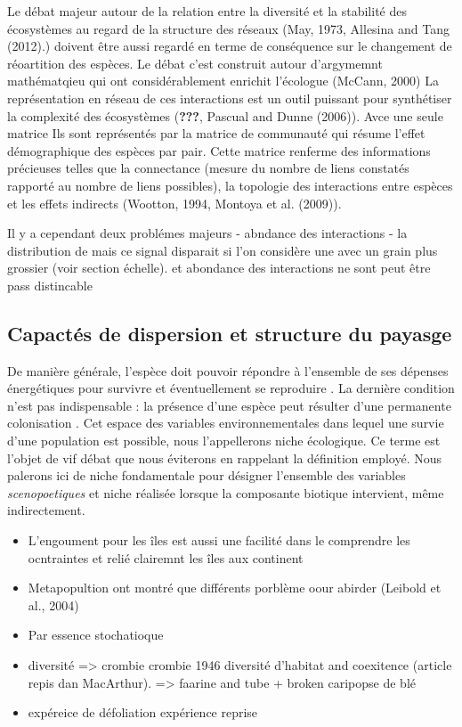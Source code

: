 Le débat majeur autour de la relation entre la diversité et la stabilité
des écosystèmes au regard de la structure des réseaux (May, 1973,
Allesina and Tang (2012).) doivent être aussi regardé en terme de
conséquence sur le changement de réoartition des espèces. Le débat c'est
construit autour d'argymemnt mathématqieu qui ont considérablement
enrichit l'écologue (McCann, 2000) La représentation en réseau de ces
interactions est un outil puissant pour synthétiser la complexité des
écosystèmes ({\textbf{???}}, Pascual and Dunne (2006)). Avce une seule
matrice Ils sont représentés par la matrice de communauté qui résume
l'effet démographique des espèces par pair. Cette matrice renferme des
informations précieuses telles que la connectance (mesure du nombre de
liens constatés rapporté au nombre de liens possibles), la topologie des
interactions entre espèces \cite{Sole2006} et les effets indirects
(Wootton, 1994, Montoya et al. (2009)).

Il y a cependant deux problémes majeurs - abndance des interactions - la
distribution de mais ce signal disparait si l'on considère une avec un
grain plus grossier (voir section échelle). et abondance des
interactions ne sont peut être pass distincable

\subsection*{Capactés de dispersion et structure du
payasge}\label{capactuxe9s-de-dispersion-et-structure-du-payasge}

De manière générale, l'espèce doit pouvoir répondre à l'ensemble de ses
dépenses énergétiques pour survivre et éventuellement se reproduire
\cite{Holt2009a}. La dernière condition n'est pas indispensable : la
présence d'une espèce peut résulter d'une permanente colonisation
\cite{Leibold2004}. Cet espace des variables environnementales dans
lequel une survie d'une population est possible, nous l'appellerons
niche écologique. Ce terme est l'objet de vif débat \cite{Chase2003} que
nous éviterons en rappelant la définition employé. Nous palerons ici de
niche fondamentale pour désigner l'ensemble des variables
\textit{scenopoetiques} et niche réalisée lorsque la composante biotique
intervient, même indirectement.

\begin{itemize}
\item
  L'engoument pour les îles est aussi une facilité dans le comprendre
  les ocntraintes et relié clairemnt les îles aux continent
\item
  Metapopultion ont montré que différents porblème oour abirder (Leibold
  et al., 2004)
\item
  Par essence stochatioque
\item
  diversité =\textgreater{} crombie crombie 1946 diversité d'habitat and
  coexitence (article repis dan MacArthur). =\textgreater{} faarine and
  tube + broken caripopse de blé
\item
  expéreice de défoliation expérience reprise
\end{itemize}

